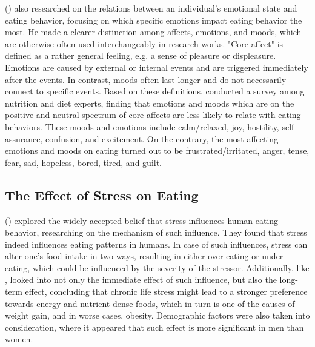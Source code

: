 \noindent \citeauthor{16_martin} (\citeyear{16_martin}) also researched on the relations between an individual's emotional state and eating behavior, focusing on which specific emotions impact eating behavior the most. He made a clearer distinction among affects, emotions, and moods, which are otherwise often used interchangeably in research works. "Core affect" is defined as a rather general feeling, e.g. a sense of pleasure or displeasure. Emotions are caused by external or internal events and are triggered immediately after the events. In contrast, moods often last longer and do not necessarily connect to specific events. Based on these definitions, \citeauthor{16_martin} conducted a survey among nutrition and diet experts, finding that emotions and moods which are on the positive and neutral spectrum of core affects are less likely to relate with eating behaviors. These moods and emotions include calm/relaxed, joy, hostility, self-assurance, confusion, and excitement. On the contrary, the most affecting emotions and moods on eating turned out to be frustrated/irritated, anger, tense, fear, sad, hopeless, bored, tired, and guilt.

\subsection{The Effect of Stress on Eating}
\citeauthor{5_stress_eating} (\citeyear{5_stress_eating}) explored the widely accepted belief that stress influences human eating behavior, researching on the mechanism of such influence. They found that stress indeed influences eating patterns in humans. In case of such influences, stress can alter one's food intake in two ways, resulting in either over-eating or under-eating, which could be influenced by the severity of the stressor. Additionally, like \citeauthor{4_mood_eat}, \citeauthor{5_stress_eating} looked into not only the immediate effect of such influence, but also the long-term effect, concluding that chronic life stress might lead to a stronger preference towards energy and nutrient-dense foods, which in turn is one of the causes of weight gain, and in worse cases, obesity. Demographic factors were also taken into consideration, where it appeared that such effect is more significant in men than women.
